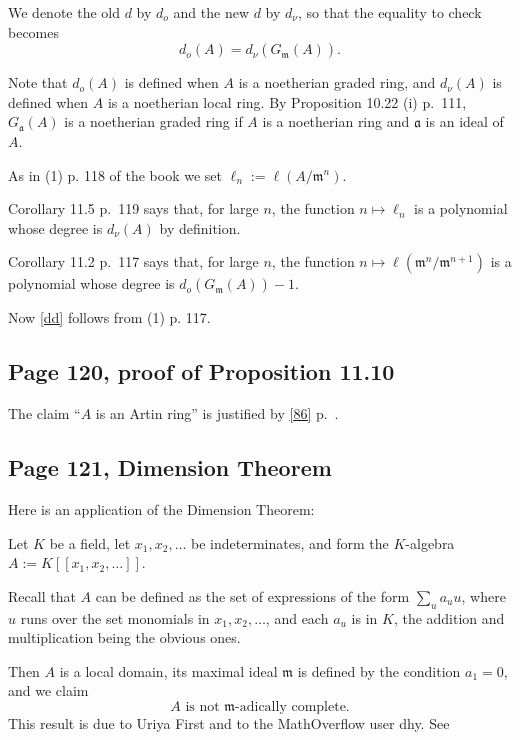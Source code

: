 \documentclass[parskip=half,fontsize=12pt]{scrartcl}%
\newcommand{\mf}{\mathfrak}
\newcommand{\mmm}{\mf m}
\begin{document}
We denote the old $d$ by $d_o$ and the new $d$ by $d_\nu$, so that the equality to check becomes 
\begin{equation}\label{dd}
d_o(A)=d_\nu(G_\mmm(A)).
\end{equation}

Note that $d_o(A)$ is defined when $A$ is a noetherian graded ring, and $d_\nu(A)$ is defined when $A$ is a noetherian local ring. By Proposition 10.22 (i) p.~111, $G_{\mf a}(A)$ is a noetherian graded ring if $A$ is a noetherian ring and $\mf a$ is an ideal of $A$.

As in (1) p. 118 of the book we set $\ell_n:=\ell(A/\mf m^n)$. 

Corollary 11.5 p.~119 says that, for large $n$, the function $n\mapsto\ell_n$ is a polynomial whose degree is $d_\nu(A)$ by definition. 

Corollary 11.2 p.~117 says that, for large $n$, the function $n\mapsto\ell(\mf m^n/\mf m^{n+1})$ is a polynomial whose degree is $d_o(G_\mmm(A))-1$.

Now \eqref{dd} follows from (1) p. 117.

\subsection{Page 120, proof of Proposition 11.10}%

The claim ``$A$ is an Artin ring'' is justified by \eqref{86} p.~\pageref{86}.

\subsection{Page 121, Dimension Theorem}\label{dt}%

Here is an application of the Dimension Theorem: 

Let $K$ be a field, let $x_1,x_2,\dots$ be indeterminates, and form the $K$-algebra  $A:=K[[x_1,x_2,\dots]]$. 

Recall that $A$ can be defined as the set of expressions of the form $\sum_ua_uu$, where $u$ runs over the set monomials in $x_1,x_2,\dots$, and each $a_u$ is in $K$, the addition and multiplication being the obvious ones. 

Then $A$ is a local domain, its maximal ideal $\mathfrak m$ is defined by the condition $a_1=0$, and we claim 
\begin{equation}\label{u1a}
\boxed{A\text{ is not }\mathfrak m\text{-adically complete.}}
\end{equation}
This result is due to Uriya First and to the MathOverflow user dhy. See \\ %
\end{document}
